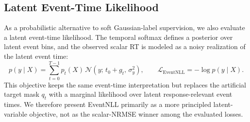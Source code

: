 \documentclass[12pt]{article}
\begin{document}
\begin{table}[!t]
\centering
\caption{Five-seed robustness summary for selected core models. Values are mean $\pm$ sample standard deviation over seeds 2025--2029; R11 range is min--max across seeds. Posterior scores are reported only for event-time segmentation runs.}
\label{tab:seed_robustness}
\scriptsize
\setlength{\tabcolsep}{3pt}
\renewcommand{\arraystretch}{1.12}
\end{table}

\subsection{Latent Event-Time Likelihood}
\label{sec:event_nll}

As a probabilistic alternative to soft Gaussian-label supervision, we also evaluate a latent event-time likelihood. The temporal softmax defines a posterior over latent event bins, and the observed scalar RT is modeled as a noisy realization of the latent event time:
\begin{equation}
\label{eq:event_nll}
p(y\mid X)
= \sum_{t=0}^{T-1} p_t(X)\,
\mathcal{N}\!\left(y;\,t_0 + g_t,\,\sigma_y^2\right),
\qquad
\mathcal{L}_{\mathrm{EventNLL}} = -\log p(y\mid X).
\end{equation}
This objective keeps the same event-time interpretation but replaces the artificial target mask $q_t$ with a marginal likelihood over latent response-relevant event times. We therefore present EventNLL primarily as a more principled latent-variable objective, not as the scalar-NRMSE winner among the evaluated losses.
\end{document}
